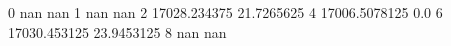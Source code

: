 0 nan nan
1 nan nan
2 17028.234375 21.7265625
4 17006.5078125 0.0
6 17030.453125 23.9453125
8 nan nan
